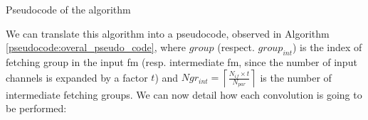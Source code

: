 \begin{algorithm}
    \centering
    \begin{algorithmic}
        \EndFor
    \end{algorithmic}
    \caption{Pseudocode of the algorithm}
    \label{pseudocode:overal_pseudo_code}
\end{algorithm}
%
We can translate this algorithm into a pseudocode, observed in Algorithm \ref{pseudocode:overal_pseudo_code}, where $group$ (respect. $group_{int}$) is the index of fetching group in the input \acrshort{fm} (resp. intermediate \acrshort{fm}, since the number of input channels is expanded by a factor $t$) and $Ngr_{int} = \left\lceil \frac{N_{if} \times t}{N_{par}} \right\rceil$ is the number of intermediate fetching groups. We can now detail how each convolution is going to be performed:

